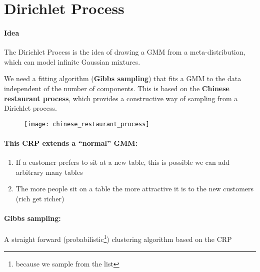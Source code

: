 
\section* {Dirichlet Process}

\paragraph{Idea}

The Dirichlet Process is the idea of drawing a GMM from a meta-distribution, which can model infinite Gaussian mixtures.

 We need a fitting algorithm (\textbf{Gibbs sampling}) that fits a GMM to the data independent of the number of components. This is based on the \textbf{Chinese restaurant process}, which provides a constructive way of sampling from a Dirichlet process.

\begin{figure}[H]
	\centering
	\texttt{[image: chinese\_restaurant\_process]}
\end{figure}

\paragraph{This CRP extends a ``normal'' GMM:}
\begin{enumerate}
	\item If a customer prefers to sit at a new table, this is possible we can add arbitrary many tables
	\item The more people sit on a table  the more attractive it is to the new customers (rich get richer)
\end{enumerate}

\paragraph{Gibbs sampling:}
A straight forward (probabilistic\footnote{because we sample from the list}) clustering algorithm based on the CRP

